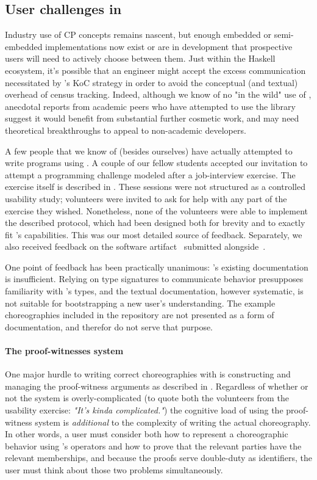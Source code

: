 \subsection{User challenges in \MultiChor}
\label{sec:usability}

Industry use of CP concepts remains nascent,
but enough embedded or semi-embedded implementations now exist or are in development that prospective users
will need to actively choose between them.
Just within the Haskell ecosystem, it's possible that an engineer might accept the excess communication necessitated by \HasChor's
KoC strategy in order to avoid the conceptual (and textual) overhead of census tracking.
Indeed, although we know of no "in the wild" use of \MultiChor,
anecdotal reports from academic peers who have attempted to use the library suggest it would benefit from substantial further cosmetic work,
and may need theoretical breakthroughs to appeal to non-academic developers.

A few people that we know of (besides ourselves) have actually attempted to write programs using \MultiChor.
A couple of our fellow students accepted our invitation to attempt a programming challenge modeled after a job-interview exercise.
The exercise itself is described in .
These sessions were not structured as a controlled usability study;
volunteers were invited to ask for help with any part of the exercise they wished.
Nonetheless, none of the volunteers were able to implement the described protocol,
which had been designed both for brevity and to exactly fit \MultiChor's capabilities.
This was our most detailed source of feedback.
Separately, 
we also received feedback on the software artifact~\cite{ourArtifact} submitted alongside~\cite{batesenclaves}.

One point of feedback has been practically unanimous:
\MultiChor's existing documentation is insufficient.
Relying on type signatures to communicate behavior presupposes familiarity with \MultiChor's types,
and the textual documentation, however systematic, is not suitable for bootstrapping a new user's understanding.
The example choreographies included in the \MultiChor repository are not presented as a form of documentation, 
and therefor do not serve that purpose.

\paragraph{The proof-witnesses system}
One major hurdle to writing correct choreographies with \MultiChor is constructing and managing the proof-witness arguments
as described in .
Regardless of whether or not the system is overly-complicated
(to quote both the volunteers from the usability exercise:
\emph{"It's kinda complicated."})
the cognitive load of using the proof-witness system is \emph{additional} to
the complexity of writing the actual choreography.
In other words,
a user must consider both how to represent a choreographic behavior using \MultiChor's operators
and how to prove that the relevant parties have the relevant memberships,
and because the proofs serve double-duty as identifiers, the user must think about those two problems simultaneously.

